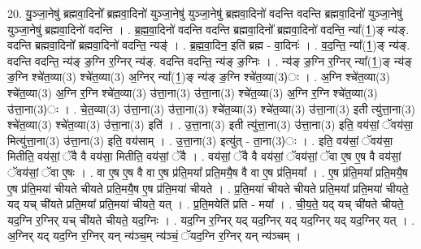 \documentclass[17pt]{extarticle}
\begin{document}
20. यु॒ञ्जा॒नेषु॑ ब्रह्मवा॒दिनो᳚ ब्रह्मवा॒दिनो॑ युञ्जा॒नेषु॑ युञ्जा॒नेषु॑ ब्रह्मवा॒दिनो॑ वदन्ति वदन्ति ब्रह्मवा॒दिनो॑ युञ्जा॒नेषु॑ युञ्जा॒नेषु॑ ब्रह्मवा॒दिनो॑ वदन्ति । . ब्र॒ह्म॒वा॒दिनो॑ वदन्ति वदन्ति ब्रह्मवा॒दिनो᳚ ब्रह्मवा॒दिनो॑ वदन्ति॒ न्या᳚(1॒)ङ् न्य॑ङ्. वदन्ति ब्रह्मवा॒दिनो᳚ ब्रह्मवा॒दिनो॑ वदन्ति॒ न्यङ्॑ । . ब्र॒ह्म॒वा॒दिन॒ इति॑ ब्रह्म - वा॒दिनः॑ । . व॒द॒न्ति॒ न्या᳚(1॒)ङ् न्य॑ङ्. वदन्ति वदन्ति॒ न्य॑ङ् ङ॒ग्नि र॒ग्निर् न्य॑ङ्. वदन्ति वदन्ति॒ न्य॑ङ् ङ॒ग्निः । . न्य॑ङ् ङ॒ग्नि र॒ग्निर् न्या᳚(1॒)ङ् न्य॑ङ् ङ॒ग्नि श्चे॑त॒व्या(3) श्चे॑त॒व्या(3) अ॒ग्निर् न्या᳚(1॒)ङ् न्य॑ङ् ङ॒ग्नि श्चे॑त॒व्या(3)ः । . अ॒ग्नि श्चे॑त॒व्या(3) श्चे॑त॒व्या(3) अ॒ग्नि र॒ग्नि श्चे॑त॒व्या(3) उ॑त्ता॒ना(3) उ॑त्ता॒ना(3) श्चे॑त॒व्या(3) अ॒ग्नि र॒ग्नि श्चे॑त॒व्या(3) उ॑त्ता॒ना(3)ः । . चे॒त॒व्या(3) उ॑त्ता॒ना(3) उ॑त्ता॒ना(3) श्चे॑त॒व्या(3) श्चे॑त॒व्या(3) उ॑त्ता॒ना(3) इती त्यु॑त्ता॒ना(3) श्चे॑त॒व्या(3) श्चे॑त॒व्या(3) उ॑त्ता॒ना(3) इति॑ । . उ॒त्ता॒ना(3) इती त्यु॑त्ता॒ना(3) उ॑त्ता॒ना(3) इति॒ वय॑सां॒ ॅवय॑सा॒ मित्यु॑त्ता॒ना(3) उ॑त्ता॒ना(3) इति॒ वय॑साम् । . उ॒त्ता॒ना(3) इत्यु॑त् - ता॒ना(3)ः । . इति॒ वय॑सां॒ ॅवय॑सा॒ मितीति॒ वय॑सां॒ ॅवै वै वय॑सा॒ मितीति॒ वय॑सां॒ ॅवै । . वय॑सां॒ ॅवै वै वय॑सां॒ ॅवय॑सां॒ ॅवा ए॒ष ए॒ष वै वय॑सां॒ ॅवय॑सां॒ ॅवा ए॒षः । . वा ए॒ष ए॒ष वै वा ए॒ष प्र॑ति॒मया᳚ प्रति॒मयै॒ष वै वा ए॒ष प्र॑ति॒मया᳚ । . ए॒ष प्र॑ति॒मया᳚ प्रति॒मयै॒ष ए॒ष प्र॑ति॒मया॑ चीयते चीयते प्रति॒मयै॒ष ए॒ष प्र॑ति॒मया॑ चीयते । . प्र॒ति॒मया॑ चीयते चीयते प्रति॒मया᳚ प्रति॒मया॑ चीयते॒ यद् यच् ची॑यते प्रति॒मया᳚ प्रति॒मया॑ चीयते॒ यत् । . प्र॒ति॒मयेति॑ प्रति - मया᳚ । . ची॒य॒ते॒ यद् यच् ची॑यते चीयते॒ यद॒ग्नि र॒ग्निर् यच् ची॑यते चीयते॒ यद॒ग्निः । . यद॒ग्नि र॒ग्निर् यद् यद॒ग्निर् यद् यद॒ग्निर् यद् यद॒ग्निर् यत् । . अ॒ग्निर् यद् यद॒ग्नि र॒ग्निर् यन् न्य॑ञ्च॒म् न्य॑ञ्चं॒ ॅयद॒ग्नि र॒ग्निर् यन् न्य॑ञ्चम् । \newline
\end{document}
